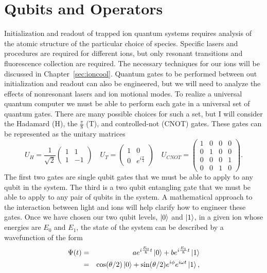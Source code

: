 \section{Qubits and Operators}
Initialization and readout of trapped ion quantum systems requires analysis of the atomic structure of the particular choice of species.  Specific lasers and procedures are required for different ions, but only resonant transitions and fluorescence collection are required.  The necessary techniques for our ions will be discussed in Chapter~\ref{sec:ioncool}.  Quantum gates to be performed between out initialization and readout can also be engineered, but we will need to analyze the effects of nonresonant lasers and ion motional modes.  To realize a universal quantum computer we must be able to perform each gate in a universal set of quantum gates.  There are many possible choices for such a set, but I will consider the Hadamard (H), the $\frac{\pi}{8}$ (T), and controlled-not (CNOT) gates.  These gates can be represented as the unitary matrices
\begin{equation}
	U_H = \frac{1}{\sqrt{2}} \left( \begin{array}{cc} 
		1 & 1 \\ 1 & -1 
	\end{array} \right) \quad
	U_T = \left( \begin{array}{cc} 
		1 & 0 \\ 0 & e^{i \frac{\pi}{4}}
	\end{array} \right) \quad
	U_{CNOT} = \left( \begin{array}{cccc}
	1 & 0 & 0 & 0 \\
	0 & 1 & 0 & 0 \\
	0 & 0 & 0 & 1 \\
	0 & 0 & 1 & 0
	\end{array}\right) \mathrm{.}
	\label{eqn:univgates}
\end{equation}
The first two gates are single qubit gates that we must be able to apply to any qubit in the system.  The third is a two qubit entangling gate that we must be able to apply to any pair of qubits in the system.  A mathematical approach to the interaction between light and ions will help clarify how to engineer these gates.  Once we have chosen our two qubit levels, $\left| 0 \right>$ and $\left| 1 \right>$, in a given ion whose energies are $E_0$ and $E_1$, the state of the system can be described by a wavefunction of the form 
\begin{eqnarray}
	\Psi(t) &=& a e^{i \frac{E_0}{\hbar} t} \left| 0 \right> + b e^{i \frac{E_1}{\hbar} t} \left| 1 \right> \\
	&=& \cos( \theta/2 ) \left| 0 \right> + \sin( \theta/2 ) e^{i \phi} e^{i \omega t} \left| 1 \right> \mathrm{,}
\end{eqnarray}
